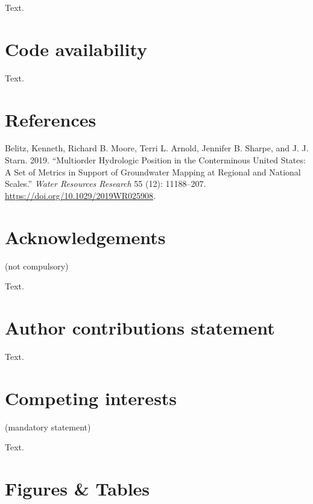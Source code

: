 \documentclass[fleqn,10pt]{wlscirep}
\newlength{\cslhangindent}
\newenvironment{CSLReferences}%
{\setlength{\parindent}{0pt}%
\everypar{\setlength{\hangindent}{\cslhangindent}}\ignorespaces}%
{\par}
\begin{document}
Text.

\section*{Code availability}

Text.

\hypertarget{references}{%
\section*{References}\label{references}}

\hypertarget{refs}{}
\begin{CSLReferences}{1}{0}
\leavevmode\hypertarget{ref-belitz_multiorder_2019}{}%
Belitz, Kenneth, Richard B. Moore, Terri L. Arnold, Jennifer B. Sharpe, and J. J. Starn. 2019. {``Multiorder {Hydrologic} {Position} in the {Conterminous} {United} {States}: {A} {Set} of {Metrics} in {Support} of {Groundwater} {Mapping} at {Regional} and {National} {Scales}.''} \emph{Water Resources Research} 55 (12): 11188--207. \url{https://doi.org/10.1029/2019WR025908}.

\end{CSLReferences}


% 


\section*{Acknowledgements} (not compulsory)

Text.

\section*{Author contributions statement}

Text.

\section*{Competing interests} (mandatory statement)

Text.

\section*{Figures \& Tables}
\end{document}
